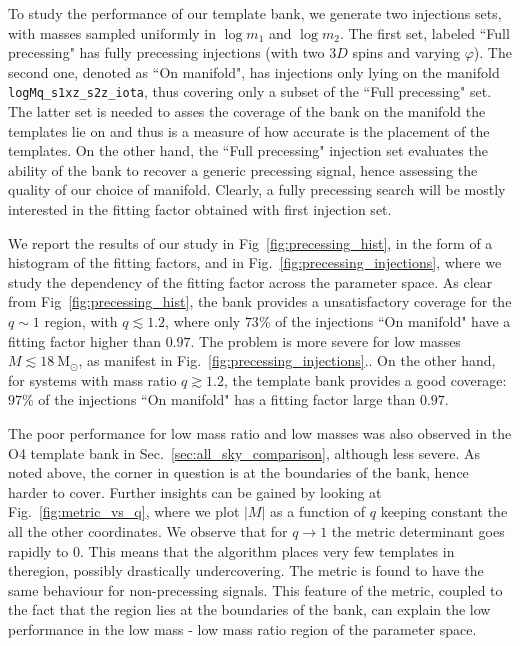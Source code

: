\documentclass[twocolumn,showpacs,preprintnumbers,nofootinbib,prd,
superscriptaddress,10pt]{revtex4-2}
\begin{document}
To study the performance of our template bank, we generate two injections sets, with masses sampled uniformly in $\log m_1$ and $\log m_2$.
The first set, labeled ``Full precessing" has fully precessing injections (with two $3D$ spins and varying $\varphi$). The second one, denoted as ``On manifold", has injections only lying on the manifold \texttt{logMq\_s1xz\_s2z\_iota}, thus covering only a subset of the ``Full precessing" set.
The latter set is needed to asses the coverage of the bank on the manifold the templates lie on and thus is a measure of how accurate is the placement of the templates.
On the other hand, the ``Full precessing" injection set evaluates the ability of the bank to recover a generic precessing signal, hence assessing the quality of our choice of manifold.
Clearly, a fully precessing search will be mostly interested in the fitting factor obtained with first injection set.

We report the results of our study in Fig~\ref{fig:precessing_hist}, in the form of a histogram of the fitting factors, and in Fig.~\ref{fig:precessing_injections}, where we study the dependency of the fitting factor across the parameter space.
As clear from Fig~\ref{fig:precessing_hist}, the bank provides a unsatisfactory coverage for the $q\sim 1$ region, with $q \lesssim 1.2$, where only $73\%$ of the injections ``On manifold" have a fitting factor higher than $0.97$. The problem is more severe for low masses $M\lesssim \SI{18}{\mathrm{M_\odot}}$, as manifest in Fig.~\ref{fig:precessing_injections}..
On the other hand, for systems with mass ratio $q \gtrsim 1.2$, the template bank provides a good coverage: $97\%$ of the injections ``On manifold" has a fitting factor large than $0.97$.

The poor performance for low mass ratio and low masses was also observed in the O4 template bank in Sec.~\ref{sec:all_sky_comparison}, although less severe. As noted above, the corner in question is at the boundaries of the bank, hence harder to cover.
Further insights can be gained by looking at Fig.~\ref{fig:metric_vs_q}, where we plot $|M|$ as a function of $q$ keeping constant the all the other coordinates. We observe that for $q \to 1$ the metric determinant goes rapidly to $0$. This means that the algorithm places very few templates in theregion, possibly drastically undercovering.
The metric is found to have the same behaviour for non-precessing signals.
This feature of the metric, coupled to the fact that the region lies at the boundaries of the bank, can explain the low performance in the low mass - low mass ratio region of the parameter space.
\end{document}
